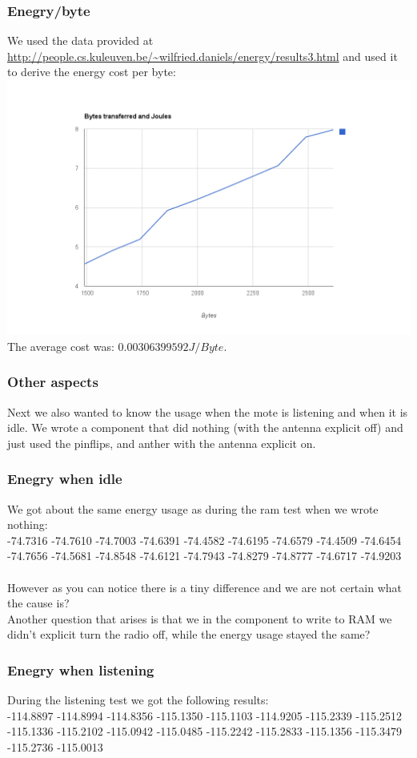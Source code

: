 \documentclass{article}
\begin{document}
\subsubsection{Enegry/byte}
We used the data provided at \url{http://people.cs.kuleuven.be/~wilfried.daniels/energy/results3.html} and used it to derive the energy cost per byte:
\includegraphics[width=\linewidth]{graph.png}
The average cost was: $0.00306399592 J/Byte.$
\subsubsection{Other aspects}
Next we also wanted to know the usage when the mote is listening and when it is idle. We wrote  a component that did nothing (with the antenna explicit off) and just used the pinflips, and anther with the antenna explicit on.
\subsubsection{Enegry when idle}
We got about the same energy usage as during the ram test when we wrote nothing:\\
-74.7316  -74.7610  -74.7003  -74.6391  -74.4582  -74.6195  -74.6579  -74.4509  -74.6454  -74.7656  -74.5681  -74.8548  -74.6121  -74.7943  -74.8279  -74.8777  -74.6717  -74.9203\\
\\
However as you can notice there is a tiny difference and we are not certain what the cause is?
\\ Another question that arises is that we in the component to write to RAM we didn't explicit turn the radio off, while the energy usage stayed the same?
\subsubsection{Enegry when listening}
During the listening test we got the following results:\\
-114.8897 -114.8994 -114.8356 -115.1350 -115.1103 -114.9205 -115.2339 -115.2512 -115.1336 -115.2102 -115.0942 -115.0485 -115.2242 -115.2833 -115.1356 -115.3479 -115.2736 -115.0013\\
\end{document}
